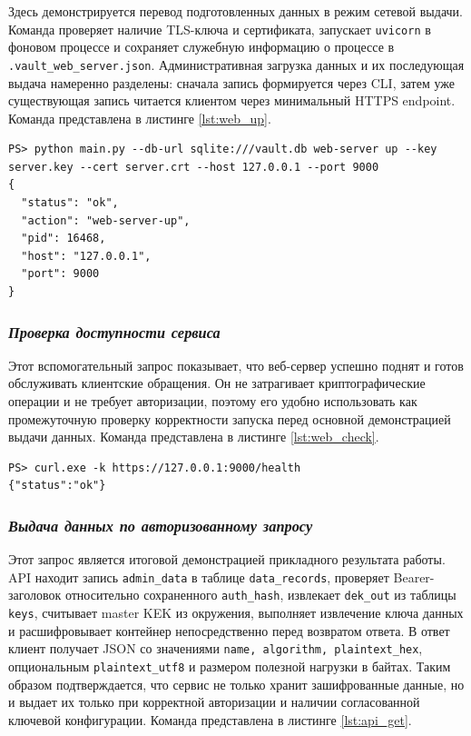 \documentclass[14pt, a4paper]{extarticle}
\begin{document}
Здесь демонстрируется перевод подготовленных данных в режим сетевой выдачи. Команда проверяет наличие TLS-ключа и сертификата, запускает \texttt{uvicorn} в фоновом процессе и сохраняет служебную информацию о процессе в \texttt{.vault\_web\_server.json}. Административная загрузка данных и их последующая выдача намеренно разделены: сначала запись формируется через CLI, затем уже существующая запись читается клиентом через минимальный HTTPS endpoint. Команда представлена в листинге \ref{lst:web_up}.



\begin{lstlisting}[style=bashcommand, caption={Запуск веб-сервера}, label=lst:web_up]
PS> python main.py --db-url sqlite:///vault.db web-server up --key server.key --cert server.crt --host 127.0.0.1 --port 9000
{
  "status": "ok",
  "action": "web-server-up",
  "pid": 16468,
  "host": "127.0.0.1",
  "port": 9000
}
\end{lstlisting}

\subsubsection*{\textit{Проверка доступности сервиса}}

Этот вспомогательный запрос показывает, что веб-сервер успешно поднят и готов обслуживать клиентские обращения. Он не затрагивает криптографические операции и не требует авторизации, поэтому его удобно использовать как промежуточную проверку корректности запуска перед основной демонстрацией выдачи данных. Команда представлена в листинге \ref{lst:web_check}.

\begin{lstlisting}[style=bashcommand, caption={Проверка состояния веб-сервера}, label=lst:web_check]
PS> curl.exe -k https://127.0.0.1:9000/health
{"status":"ok"}
\end{lstlisting}

\subsubsection*{\textit{Выдача данных по авторизованному запросу}}

Этот запрос является итоговой демонстрацией прикладного результата работы. API находит запись \texttt{admin\_data} в таблице \texttt{data\_records}, проверяет Bearer-заголовок относительно сохраненного \texttt{auth\_hash}, извлекает \texttt{dek\_out} из таблицы \texttt{keys}, считывает master KEK из окружения, выполняет извлечение ключа данных и расшифровывает контейнер непосредственно перед возвратом ответа. В ответ клиент получает JSON со значениями \texttt{name, algorithm, plaintext\_hex}, опциональным \texttt{plaintext\_utf8} и размером полезной нагрузки в байтах. Таким образом подтверждается, что сервис не только хранит зашифрованные данные, но и выдает их только при корректной авторизации и наличии согласованной ключевой конфигурации. Команда представлена в листинге \ref{lst:api_get}.
\end{document}
